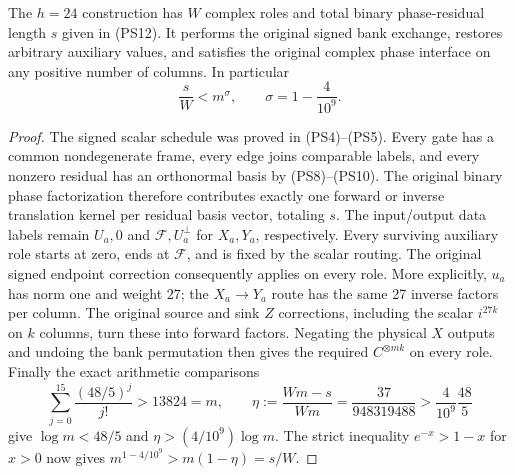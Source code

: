 \begin{proposition}\label{prop:pair-star-complex-interface}
The $h=24$ construction has $W$ complex roles and total binary phase-residual
length $s$ given in (PS12).  It performs the original signed bank exchange,
restores arbitrary auxiliary values, and satisfies the original complex
phase interface on any positive number of columns.  In particular
\[
 \frac{s}{W}<m^\sigma,\qquad \sigma=1-\frac4{10^9}.
\]
\end{proposition}
\begin{proof}
The signed scalar schedule was proved in (PS4)--(PS5).  Every gate has a
common nondegenerate frame, every edge joins comparable labels, and every
nonzero residual has an orthonormal basis by (PS8)--(PS10).  The original
binary phase factorization therefore contributes exactly one forward or
inverse translation kernel per residual basis vector, totaling $s$.
The input/output data labels remain $U_a,0$ and
$\mathcal F,U_a^\perp$ for $X_a,Y_a$, respectively.  Every surviving
auxiliary role starts at zero, ends at $\mathcal F$, and is fixed by the
scalar routing.  The original signed endpoint correction consequently
applies on every role.  More explicitly, $u_a$ has norm one and weight
$27$; the $X_a\to Y_a$ route has the same 27 inverse factors per column.
The original source and sink $Z$ corrections, including the scalar
$i^{27k}$ on $k$ columns, turn these into forward factors.  Negating the
physical $X$ outputs and undoing the bank permutation then gives the
required $C^{\otimes mk}$ on every role.  Finally the exact arithmetic
comparisons
\[
 \sum_{j=0}^{15}\frac{(48/5)^j}{j!}>13824=m,\qquad
 \eta:=\frac{Wm-s}{Wm}=\frac{37}{948319488}
                   >\frac4{10^9}\frac{48}{5}
\]
give $\log m<48/5$ and $\eta>(4/10^9)\log m$.
The strict inequality $e^{-x}>1-x$ for $x>0$ now gives
$m^{1-4/10^9}>m(1-\eta)=s/W$.
\end{proof}
